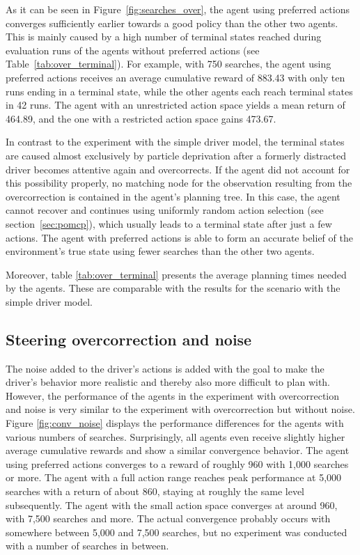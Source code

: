 

As it can be seen in Figure~\ref{fig:searches_over}, the agent using preferred actions converges sufficiently earlier towards a good policy than the other two agents. This is mainly caused by a high number of terminal states reached during evaluation runs of the agents without preferred actions (see Table~\ref{tab:over_terminal}). For example, with 750 searches, the agent using preferred actions receives an average cumulative reward of 883.43 with only ten runs ending in a terminal state, while the other agents each reach terminal states in 42 runs. The agent with an unrestricted action space yields a mean return of 464.89, and the one with a restricted action space gains 473.67. 

  

In contrast to the experiment with the simple driver model, the terminal states are caused almost exclusively by particle deprivation after a formerly distracted driver becomes attentive again and overcorrects. If the agent did not account for this possibility properly, no matching node for the observation resulting from the overcorrection is contained in the agent's planning tree. In this case, the agent cannot recover and continues using uniformly random action selection (see section~\ref{sec:pomcp}), which usually leads to a terminal state after just a few actions. The agent with preferred actions is able to form an accurate belief of the environment's true state using fewer searches than the other two agents.

Moreover, table \ref{tab:over_terminal} presents the average planning times needed by the agents. These are comparable with the results for the scenario with the simple driver model.

\subsection{Steering overcorrection and noise}

The noise added to the driver's actions is added with the goal to make the driver's behavior more realistic and thereby also more difficult to plan with. However, the performance of the agents in the experiment with overcorrection and noise is very similar to the experiment with overcorrection but without noise. Figure \ref{fig:conv_noise} displays the performance differences for the agents with various numbers of searches. Surprisingly, all agents even receive slightly higher average cumulative rewards and show a similar convergence behavior. The agent using preferred actions converges to a reward of roughly 960 with 1,000 searches or more. The agent with a full action range reaches peak performance at 5,000 searches with a return of about 860, staying at roughly the same level subsequently. The agent with the small action space converges at around 960, with 7,500 searches and more. The actual convergence probably occurs with somewhere between 5,000 and 7,500 searches, but no experiment was conducted with a number of searches in between.

